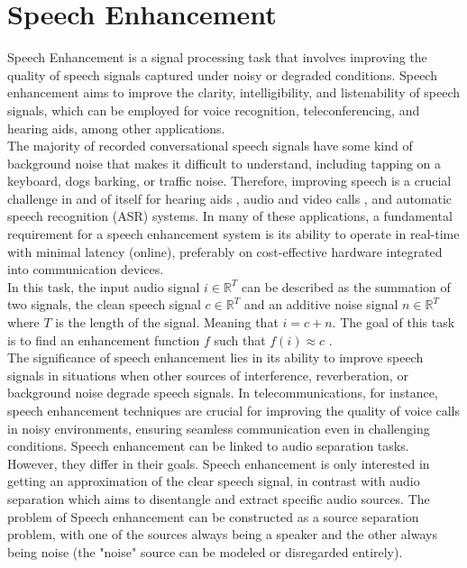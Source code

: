 \section{Speech Enhancement}
Speech Enhancement is a signal processing task that involves improving the quality of speech signals captured under noisy or degraded conditions. Speech enhancement aims to improve the clarity, intelligibility, and listenability of speech signals, which can be employed for voice recognition, teleconferencing, and hearing aids, among other applications.\\
The majority of recorded conversational speech signals have some kind of background noise that makes it difficult to understand, including tapping on a keyboard, dogs barking, or traffic noise. Therefore, improving speech is a crucial challenge in and of itself for hearing aids \cite{reddy2018}, audio and video calls \cite{reddy2019}, and automatic speech recognition (ASR) systems.
In many of these applications, a fundamental requirement for a speech enhancement system is its ability to operate in real-time with minimal latency (online), preferably on cost-effective hardware integrated into communication devices.\\
In this task, the input audio signal $i \in \mathbb{R}^T$ can be described as the summation of two signals, the clean speech signal $c \in \mathbb{R}^T$ and an additive noise signal $n \in \mathbb{R}^T$ where $T$ is the length of the signal. Meaning that $i=c+n$. The goal of this task is to find an enhancement function $f$ such that $f(i) \approx c$ \cite{defossez2020}.\\
The significance of speech enhancement lies in its ability to improve speech signals in situations when other sources of interference, reverberation, or background noise degrade speech signals. In telecommunications, for instance, speech enhancement techniques are crucial for improving the quality of voice calls in noisy environments, ensuring seamless communication even in challenging conditions.
Speech enhancement can be linked to audio separation tasks. However, they differ in their goals. Speech enhancement is only interested in getting an approximation of the clear speech signal, in contrast with audio separation which aims to disentangle and extract specific audio sources. The problem of Speech enhancement can be constructed as a source separation problem, with one of the sources always being a speaker and the other always being noise (the "noise" source can be modeled or disregarded entirely).

